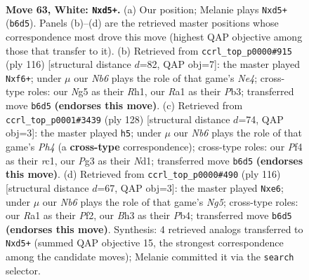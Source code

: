 \documentclass[11pt]{article}
\begin{document}
\clearpage

\begin{figure}[p]\centering
\begin{subfigure}{0.46\textwidth}\centering
\resizebox{\linewidth}{!}{%
\newchessgame
\chessboard[
  setfen={8/Pb6/1N3k2/2nn2N1/1p3P2/1P2K1PB/7P/R7 w - - 7 63},
  showmover=false,
  pgfstyle=straightmove, color=movearrow, markmove={b6-d5}
]}
\caption{}
\end{subfigure}\hfill
\begin{subfigure}{0.46\textwidth}\centering
\resizebox{\linewidth}{!}{%
\newchessgame
\chessboard[
  setfen={6k1/3r4/p1Np1n2/3n4/4N3/1P3PP1/2PK4/7R w - - 0 59},
  showmover=false,
  pgfstyle=straightmove, color=movearrow, markmove={e4-f6}
]}
\caption{}
\end{subfigure}
\\[4pt]
\begin{subfigure}{0.46\textwidth}\centering
\resizebox{\linewidth}{!}{%
\newchessgame
\chessboard[
  setfen={4Q3/1k6/p7/1p2b1P1/1P2b2P/P4n2/4KP2/2rN4 w - - 17 65},
  showmover=false,
  pgfstyle=straightmove, color=movearrow, markmove={h4-h5}
]}
\caption{}
\end{subfigure}\hfill
\begin{subfigure}{0.46\textwidth}\centering
\resizebox{\linewidth}{!}{%
\newchessgame
\chessboard[
  setfen={5bk1/8/4n2r/3RPpNP/1P3P2/P7/5PK1/8 w - - 1 59},
  showmover=false,
  pgfstyle=straightmove, color=movearrow, markmove={g5-e6}
]}
\caption{}
\end{subfigure}
\caption{\textbf{Move 63, White: \texttt{Nxd5+}.} (a) Our position; Melanie plays \texttt{Nxd5+} (\texttt{b6d5}). Panels (b)--(d) are the retrieved master positions whose correspondence most drove this move (highest QAP objective among those that transfer to it). (b) Retrieved from \texttt{ccrl\_top\_p0000\#915} (ply 116) [structural distance $d$=82, QAP obj=7]: the master played \texttt{Nxf6+}; under $\mu$ our \emph{Nb6} plays the role of that game's \emph{Ne4}; cross-type roles: our \emph{N}g5 as their \emph{R}h1, our \emph{R}a1 as their \emph{P}b3; transferred move \texttt{b6d5} \textbf{(endorses this move)}. (c) Retrieved from \texttt{ccrl\_top\_p0001\#3439} (ply 128) [structural distance $d$=74, QAP obj=3]: the master played \texttt{h5}; under $\mu$ our \emph{Nb6} plays the role of that game's \emph{Ph4} (a \textbf{cross-type} correspondence); cross-type roles: our \emph{P}f4 as their \emph{r}c1, our \emph{P}g3 as their \emph{N}d1; transferred move \texttt{b6d5} \textbf{(endorses this move)}. (d) Retrieved from \texttt{ccrl\_top\_p0000\#490} (ply 116) [structural distance $d$=67, QAP obj=3]: the master played \texttt{Nxe6}; under $\mu$ our \emph{Nb6} plays the role of that game's \emph{Ng5}; cross-type roles: our \emph{R}a1 as their \emph{P}f2, our \emph{B}h3 as their \emph{P}b4; transferred move \texttt{b6d5} \textbf{(endorses this move)}. Synthesis: 4 retrieved analogs transferred to \texttt{Nxd5+} (summed QAP objective 15, the strongest correspondence among the candidate moves); Melanie committed it via the \texttt{search} selector.}
\label{fig:thought-m124}
\end{figure}
\end{document}
